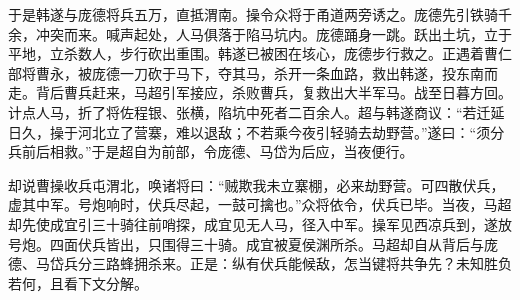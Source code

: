 于是韩遂与庞德将兵五万，直抵渭南。操令众将于甬道两旁诱之。庞德先引铁骑千余，冲突而来。喊声起处，人马俱落于陷马坑内。庞德踊身一跳。跃出土坑，立于平地，立杀数人，步行砍出重围。韩遂已被困在垓心，庞德步行救之。正遇着曹仁部将曹永，被庞德一刀砍于马下，夺其马，杀开一条血路，救出韩遂，投东南而走。背后曹兵赶来，马超引军接应，杀败曹兵，复救出大半军马。战至日暮方回。计点人马，折了将佐程银、张横，陷坑中死者二百余人。超与韩遂商议：“若迁延日久，操于河北立了营寨，难以退敌；不若乘今夜引轻骑去劫野营。”遂曰：“须分兵前后相救。”于是超自为前部，令庞德、马岱为后应，当夜便行。

却说曹操收兵屯渭北，唤诸将曰：“贼欺我未立寨棚，必来劫野营。可四散伏兵，虚其中军。号炮响时，伏兵尽起，一鼓可擒也。”众将依令，伏兵已毕。当夜，马超却先使成宜引三十骑往前哨探，成宜见无人马，径入中军。操军见西凉兵到，遂放号炮。四面伏兵皆出，只围得三十骑。成宜被夏侯渊所杀。马超却自从背后与庞德、马岱兵分三路蜂拥杀来。正是：纵有伏兵能候敌，怎当键将共争先？未知胜负若何，且看下文分解。